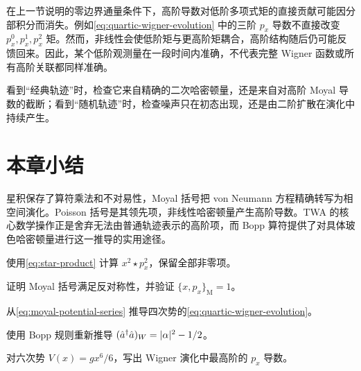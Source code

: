 在上一节说明的零边界通量条件下，高阶导数对低阶多项式矩的直接贡献可能因分部积分而消失。例如\cref{eq:quartic-wigner-evolution} 中的三阶 $p_x$ 导数不直接改变 $p_x^0,p_x^1,p_x^2$ 矩。然而，非线性会使低阶矩与更高阶矩耦合，高阶结构随后仍可能反馈回来。因此，某个低阶观测量在一段时间内准确，不代表完整 Wigner 函数或所有高阶关联都同样准确。

\begin{chaptercheck}
看到“经典轨迹”时，检查它来自精确的二次哈密顿量，还是来自对高阶 Moyal 导数的截断；看到“随机轨迹”时，检查噪声只在初态出现，还是由二阶扩散在演化中持续产生。
\end{chaptercheck}

\section*{本章小结}

星积保存了算符乘法和不对易性，Moyal 括号把 von Neumann 方程精确转写为相空间演化。Poisson 括号是其领先项，非线性哈密顿量产生高阶导数。TWA 的核心数学操作正是舍弃无法由普通轨迹表示的高阶项，而 Bopp 算符提供了对具体玻色哈密顿量进行这一推导的实用途径。

\begin{exercises}
  \item 使用\cref{eq:star-product} 计算 $x^2\star p_x^2$，保留全部非零项。
  \item 证明 Moyal 括号满足反对称性，并验证 $\{x,p_x\}_{\mathrm{M}}=1$。
  \item 从\cref{eq:moyal-potential-series} 推导四次势的\cref{eq:quartic-wigner-evolution}。
  \item 使用 Bopp 规则重新推导 $(\hat a^{\dagger}\hat a)_W=|\alpha|^2-1/2$。
  \item 对六次势 $V(x)=gx^6/6$，写出 Wigner 演化中最高阶的 $p_x$ 导数。
\end{exercises}
